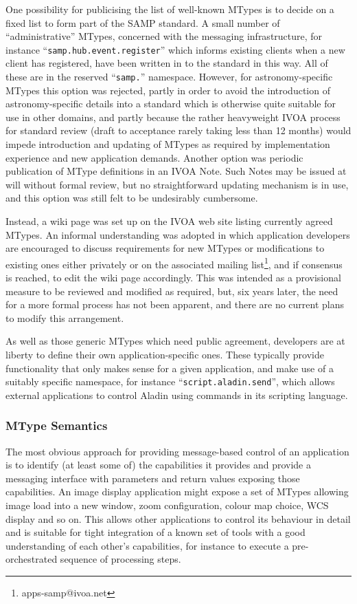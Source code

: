 \documentclass[5p]{elsarticle}
\begin{document}
One possibility for publicising the list of well-known MTypes
is to decide on a fixed list to form part of the SAMP standard.
A small number of ``administrative'' MTypes,
concerned with the messaging infrastructure,
for instance ``{\tt samp.hub.event.register}''
which informs existing clients when a new client has registered,
have been written in to the standard in this way.
All of these are in the reserved ``{\tt samp.}'' namespace.
However, for astronomy-specific MTypes this option was rejected,
partly in order to avoid the introduction of astronomy-specific details
into a standard which is otherwise quite suitable for use in other domains,
and partly because the rather heavyweight IVOA process for
standard review\citep{ivoadoc}
(draft to acceptance rarely taking less than 12 months)
would impede introduction and updating of MTypes as required
by implementation experience and new application demands.
Another option was periodic publication of MType definitions
in an IVOA Note.  Such Notes may be issued at will without formal review,
but no straightforward updating mechanism is in use,
and this option was still felt to be undesirably cumbersome.

Instead, a wiki page was set up on the
IVOA web site listing currently agreed MTypes.
An informal understanding was adopted in which
application developers are encouraged to discuss requirements for
new MTypes or modifications to existing ones either privately or
on the associated mailing list\footnote{apps-samp@ivoa.net}, 
and if consensus is reached, to edit the wiki page accordingly.
This was intended as a provisional measure to be reviewed and
modified as required, but, six years later, the need for a more
formal process has not been apparent, and there are no current
plans to modify this arrangement.

As well as those generic MTypes which need public agreement,
developers are at liberty to define their own application-specific ones.
These typically provide functionality that only makes sense for
a given application, and make use of a suitably specific namespace,
for instance ``{\tt script.aladin.send}'',
which allows external applications to control Aladin
\citep{2000A&AS..143...33B} using commands in its scripting language.

\subsubsection{MType Semantics}

The most obvious approach for providing message-based control
of an application
is to identify (at least some of) the capabilities it provides and
provide a messaging interface with parameters and return values
exposing those capabilities.  An image display application might
expose a set of MTypes allowing image load into a new window,
zoom configuration, colour map choice, WCS display and so on.
This allows other applications to control its behaviour
in detail and is suitable for tight integration of a known set
of tools with a good understanding of each other's capabilities,
for instance to execute a pre-orchestrated sequence of processing steps.
\end{document}
